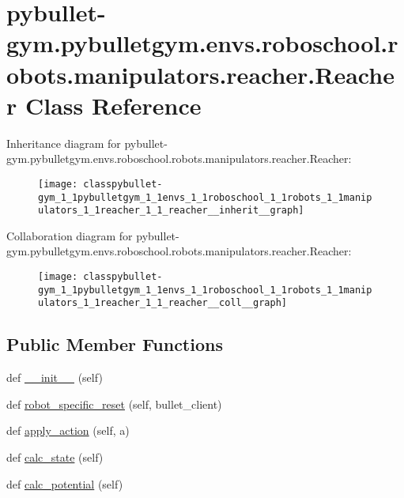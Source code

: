 \hypertarget{classpybullet-gym_1_1pybulletgym_1_1envs_1_1roboschool_1_1robots_1_1manipulators_1_1reacher_1_1_reacher}{}\section{pybullet-\/gym.pybulletgym.\+envs.\+roboschool.\+robots.\+manipulators.\+reacher.\+Reacher Class Reference}
\label{classpybullet-gym_1_1pybulletgym_1_1envs_1_1roboschool_1_1robots_1_1manipulators_1_1reacher_1_1_reacher}


Inheritance diagram for pybullet-\/gym.pybulletgym.\+envs.\+roboschool.\+robots.\+manipulators.\+reacher.\+Reacher\+:
\nopagebreak
\begin{figure}[H]
\begin{center}
\leavevmode
\texttt{[image: classpybullet-gym\_1\_1pybulletgym\_1\_1envs\_1\_1roboschool\_1\_1robots\_1\_1manipulators\_1\_1reacher\_1\_1\_reacher\_\_inherit\_\_graph]}
\end{center}
\end{figure}


Collaboration diagram for pybullet-\/gym.pybulletgym.\+envs.\+roboschool.\+robots.\+manipulators.\+reacher.\+Reacher\+:
\nopagebreak
\begin{figure}[H]
\begin{center}
\leavevmode
\texttt{[image: classpybullet-gym\_1\_1pybulletgym\_1\_1envs\_1\_1roboschool\_1\_1robots\_1\_1manipulators\_1\_1reacher\_1\_1\_reacher\_\_coll\_\_graph]}
\end{center}
\end{figure}
\subsection*{Public Member Functions}
\begin{DoxyCompactItemize}
\item 
def \hyperlink{classpybullet-gym_1_1pybulletgym_1_1envs_1_1roboschool_1_1robots_1_1manipulators_1_1reacher_1_1_reacher_a8ca73b916966eca63fa2727ae3d1e482}{\+\_\+\+\_\+init\+\_\+\+\_\+} (self)
\item 
def \hyperlink{classpybullet-gym_1_1pybulletgym_1_1envs_1_1roboschool_1_1robots_1_1manipulators_1_1reacher_1_1_reacher_a27b9c90bc1ec8757fc4d806488fe5d6a}{robot\+\_\+specific\+\_\+reset} (self, bullet\+\_\+client)
\item 
def \hyperlink{classpybullet-gym_1_1pybulletgym_1_1envs_1_1roboschool_1_1robots_1_1manipulators_1_1reacher_1_1_reacher_aff7f8862ca48fd260160b68df6fdf1fb}{apply\+\_\+action} (self, a)
\item 
def \hyperlink{classpybullet-gym_1_1pybulletgym_1_1envs_1_1roboschool_1_1robots_1_1manipulators_1_1reacher_1_1_reacher_ad565e98bf160e2e00bdd0e4fe3396330}{calc\+\_\+state} (self)
\item 
def \hyperlink{classpybullet-gym_1_1pybulletgym_1_1envs_1_1roboschool_1_1robots_1_1manipulators_1_1reacher_1_1_reacher_abb605b2123438504aec3f436a89cd8f6}{calc\+\_\+potential} (self)
\end{DoxyCompactItemize}
